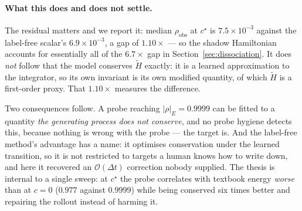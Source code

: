 \paragraph{What this does and does not settle.}
The residual matters and we report it: median $\rho_{\mathrm{obs}}$ at $c^\star$ is
$7.5\times10^{-3}$ against the label-free scalar's $6.9\times10^{-3}$, a gap of $1.10\times$ --- so
the shadow Hamiltonian accounts for essentially all of the $6.7\times$ gap in
Section~\ref{sec:dissociation}. It does \emph{not} follow that the model conserves $\tilde H$ exactly:
it is a learned approximation to the integrator, so its own invariant is its own modified quantity,
of which $\tilde H$ is a first-order proxy. That $1.10\times$ measures the difference.

Two consequences follow. A probe reaching $|\rho|_E = 0.9999$ can be fitted to a quantity \emph{the
generating process does not conserve}, and no probe hygiene detects this, because nothing is wrong
with the probe --- the target is. And the label-free method's advantage has a name: it optimises
conservation under the learned transition, so it is not restricted to targets a human knows how to
write down, and here it recovered an $\mathcal{O}(\Delta t)$ correction nobody supplied. The thesis
is internal to a single sweep: at $c^\star$ the probe correlates with textbook energy \emph{worse}
than at $c=0$ ($0.977$ against $0.9999$) while being conserved six times better and repairing the
rollout instead of harming it.
